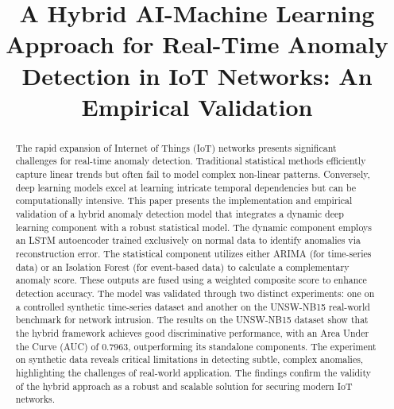 \documentclass[conference]{IEEEtran}
\begin{document}
\title{A Hybrid AI-Machine Learning Approach for Real-Time Anomaly Detection in IoT Networks: An Empirical Validation}

\author{
\and
{}
}

\maketitle

\begin{abstract}
The rapid expansion of Internet of Things (IoT) networks presents significant challenges for real-time anomaly detection. Traditional statistical methods efficiently capture linear trends but often fail to model complex non-linear patterns. Conversely, deep learning models excel at learning intricate temporal dependencies but can be computationally intensive. This paper presents the implementation and empirical validation of a hybrid anomaly detection model that integrates a dynamic deep learning component with a robust statistical model. The dynamic component employs an LSTM autoencoder trained exclusively on normal data to identify anomalies via reconstruction error. The statistical component utilizes either ARIMA (for time-series data) or an Isolation Forest (for event-based data) to calculate a complementary anomaly score. These outputs are fused using a weighted composite score to enhance detection accuracy. The model was validated through two distinct experiments: one on a controlled synthetic time-series dataset and another on the UNSW-NB15 real-world benchmark for network intrusion. The results on the UNSW-NB15 dataset show that the hybrid framework achieves good discriminative performance, with an Area Under the Curve (AUC) of 0.7963, outperforming its standalone components. The experiment on synthetic data reveals critical limitations in detecting subtle, complex anomalies, highlighting the challenges of real-world application. The findings confirm the validity of the hybrid approach as a robust and scalable solution for securing modern IoT networks.
\end{abstract}
\end{document}
